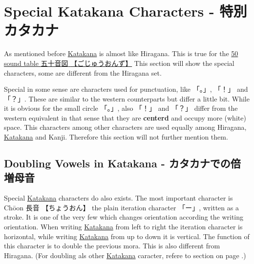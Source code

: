\section{Special Katakana Characters - 特別カタカナ}\label{sec:SpecialKatakanaCharacters}

As mentioned before \hyperref[sec:Katakana]{Katakana} is almost like Hiragana.
This is true for the \hyperref[sec:50SoundTable]{50 sound table  {五十音図}
{【ごじゅうおんず】}} This section will show the special characters, some are
different from the Hiragana set.

Special in some sense are characters used for punctuation, like {「。」},
{「！」} and {「？」}.  These are similar to the western counterparts but
differ a little bit. While it is obvious for the small circle {「。」}, also
{「！」} and {「？」} differ from the western equivalent in that sense that
they are \textbf{centerd} and occupy more (white) space. This characters among
other characters are used equally among Hiragana,
\hyperref[sec:Katakana]{Katakana} and Kanji. Therefore this section will not
further mention them.


\subsection{Doubling Vowels in Katakana - カタカナでの倍増母音}\label{subsec:DoublingVowel}


Special \hyperref[sec:Katakana]{Katakana} characters do also exists. The most
important character is Chōon {長音} {【ちょうおん】} the plain iteration
character {「ー」}, written as a stroke. It is one of the very few which
changes orientation according the writing orientation. When writing
\hyperref[sec:Katakana]{Katakana} from left to right the iteration character is
horizontal, while writing \hyperref[sec:Katakana]{Katakana} from up to down it
is vertical. The function of this character is to double the previous mora.
This is also different from Hiragana. (For doubling als other
\hyperref[sec:Katakana]{Katakana} caracter, refere to section
 on page \pageref{sec:Iteration}.)

\bigskip


